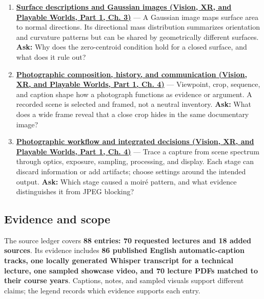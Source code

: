 \begin{enumerate}
\item
  \textbf{\href{../07-Vision-XR-and-Playable-Worlds-P01/main.pdf\#04-visual-computing-ii-ch032-surface-descriptions-and-gaussian-images}{Surface descriptions and Gaussian images (Vision, XR, and Playable Worlds, Part 1, Ch. 3)}} --- A Gaussian image maps surface area to normal directions. Its directional mass distribution summarizes orientation and curvature patterns but can be shared by geometrically different surfaces. \textbf{Ask:} Why does the zero-centroid condition hold for a closed surface, and what does it rule out?
\item
  \textbf{\href{../07-Vision-XR-and-Playable-Worlds-P01/main.pdf\#04-visual-computing-ii-ch034-photographic-composition-history-and-communication}{Photographic composition, history, and communication (Vision, XR, and Playable Worlds, Part 1, Ch. 4)}} --- Viewpoint, crop, sequence, and caption shape how a photograph functions as evidence or argument. A recorded scene is selected and framed, not a neutral inventory. \textbf{Ask:} What does a wide frame reveal that a close crop hides in the same documentary image?
\item
  \textbf{\href{../07-Vision-XR-and-Playable-Worlds-P01/main.pdf\#04-visual-computing-ii-ch034-photographic-workflow-and-integrated-decisions}{Photographic workflow and integrated decisions (Vision, XR, and Playable Worlds, Part 1, Ch. 4)}} --- Trace a capture from scene spectrum through optics, exposure, sampling, processing, and display. Each stage can discard information or add artifacts; choose settings around the intended output. \textbf{Ask:} Which stage caused a moiré pattern, and what evidence distinguishes it from JPEG blocking?
\end{enumerate}

\subsection{Evidence and scope}\label{appendix-a8f634b076b5-evidence-and-scope}

\hypertarget{appendix-a8f634b076b5-evidence-and-scope}{}

The source ledger covers \textbf{88 entries: 70 requested lectures and 18 added sources}. Its evidence includes \textbf{86 published English automatic-caption tracks, one locally generated Whisper transcript for a technical lecture, one sampled showcase video, and 70 lecture PDFs matched to their course years}. Captions, notes, and sampled visuals support different claims; the legend records which evidence supports each entry.

